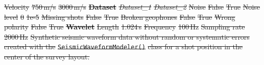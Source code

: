 \documentclass[a4paper,fleqn]{cas-sc}
\providecommand{\DIFdel}[1]{{\protect\color{red}\sout{#1}}}                      %
\providecommand{\DIFdelFL}[1]{\DIFdel{#1}} %
\begin{document}
\DIFdelFL{Velocity }%
\DIFdelFL{750\,m/s }%
\DIFdelFL{3000\,m/s }%
\textbf{\DIFdelFL{Dataset}} %
\textit{\DIFdelFL{Dataset\_1}} %
\textit{\DIFdelFL{Dataset\_2}} %
\DIFdelFL{Noise }%
\DIFdelFL{False }%
\DIFdelFL{True }%
\DIFdelFL{Noise level }%
\DIFdelFL{0 }%
\DIFdelFL{1e-5 }%
\DIFdelFL{Missing shots }%
\DIFdelFL{False }%
\DIFdelFL{True }%
\DIFdelFL{Broken geophones }%
\DIFdelFL{False }%
\DIFdelFL{True }%
\DIFdelFL{Wrong polarity }%
\DIFdelFL{False }%
\DIFdelFL{True }%
\textbf{\DIFdelFL{Wavelet}} %
\DIFdelFL{Length }%
\DIFdelFL{1.024\,s }%
\DIFdelFL{Frequency }%
\DIFdelFL{100\,Hz }%
\DIFdelFL{Sampling rate }%
\DIFdelFL{2000\,Hz }%
{%
\DIFdelFL{Synthetic seismic waveform data without random or systematic errors created with the }\texttt{\DIFdelFL{SeismicWaveformModeler()}} %
\DIFdelFL{class for a shot position in the center of the survey layout.}}
\end{document}
